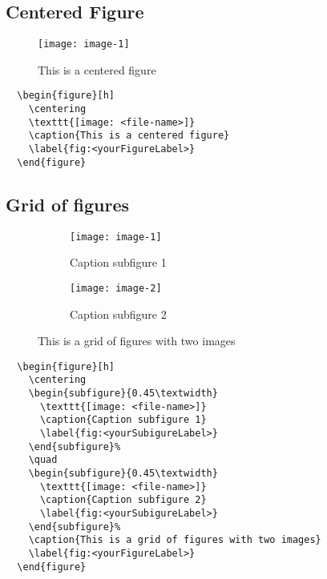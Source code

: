 \clearpage
\subsection{Centered Figure}

\begin{figure}[h]
  \centering
  \texttt{[image: image-1]}
  \caption{This is a centered figure}
  \label{fig:centeredFigure}
\end{figure}

\begin{lstlisting}
  \begin{figure}[h]
    \centering
    \texttt{[image: <file-name>]}
    \caption{This is a centered figure}
    \label{fig:<yourFigureLabel>}
  \end{figure}
\end{lstlisting}

\clearpage
\subsection{Grid of figures}

\begin{figure}[h]
  \centering
  \begin{subfigure}{0.45\textwidth}
    \texttt{[image: image-1]} 
    \caption{Caption subfigure 1}
    \label{fig:subim1}
  \end{subfigure}%
  \quad
  \begin{subfigure}{0.45\textwidth}
    \texttt{[image: image-2]}
    \caption{Caption subfigure 2}
    \label{fig:subim2}
  \end{subfigure}%
  \caption{This is a grid of figures with two images}
  \label{fig:figuresGrid}
\end{figure}

\begin{lstlisting}
  \begin{figure}[h]
    \centering
    \begin{subfigure}{0.45\textwidth}
      \texttt{[image: <file-name>]} 
      \caption{Caption subfigure 1}
      \label{fig:<yourSubigureLabel>}
    \end{subfigure}%
    \quad
    \begin{subfigure}{0.45\textwidth}
      \texttt{[image: <file-name>]}
      \caption{Caption subfigure 2}
      \label{fig:<yourSubigureLabel>}
    \end{subfigure}%
    \caption{This is a grid of figures with two images}
    \label{fig:<yourFigureLabel>}
  \end{figure}
\end{lstlisting}

